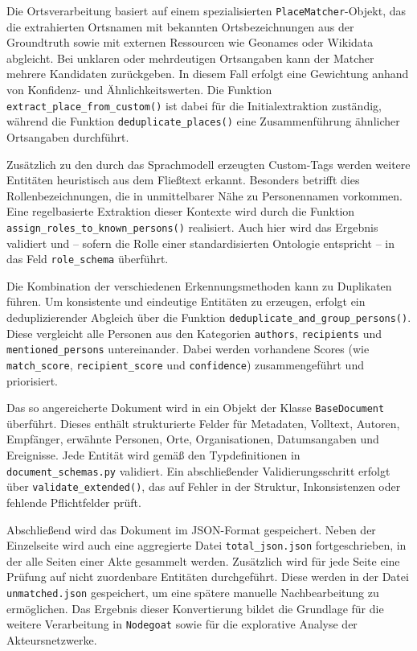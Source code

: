\documentclass[12pt, a4paper, ngerman, bidi=default]{article}
\newcommand{\code}[1]{\colorbox{VeryLightGray}{\texttt{#1}}} %
\begin{document}
Die Ortsverarbeitung basiert auf einem spezialisierten \code{PlaceMatcher}-Objekt, das die extrahierten Ortsnamen mit bekannten 
Ortsbezeichnungen aus der Groundtruth sowie mit externen Ressourcen wie Geonames oder Wikidata abgleicht. Bei unklaren oder 
mehrdeutigen Ortsangaben kann der Matcher mehrere Kandidaten zurückgeben. In diesem Fall erfolgt eine Gewichtung anhand von 
Konfidenz- und Ähnlichkeitswerten. Die Funktion \code{extract\_place\_from\_custom()} ist dabei für die Initialextraktion 
zuständig, während die Funktion \code{deduplicate\_places()} eine Zusammenführung ähnlicher Ortsangaben durchführt.

Zusätzlich zu den durch das Sprachmodell erzeugten Custom-Tags werden weitere Entitäten heuristisch aus dem Fließtext erkannt. 
Besonders betrifft dies Rollenbezeichnungen, die in unmittelbarer Nähe zu Personennamen vorkommen. Eine regelbasierte Extraktion 
dieser Kontexte wird durch die Funktion \code{assign\_roles\_to\_known\_persons()} realisiert. Auch hier wird das Ergebnis validiert 
und – sofern die Rolle einer standardisierten Ontologie entspricht – in das Feld \code{role\_schema} überführt.

Die Kombination der verschiedenen Erkennungsmethoden kann zu Duplikaten führen. Um konsistente und eindeutige Entitäten zu erzeugen, 
erfolgt ein deduplizierender Abgleich über die Funktion \code{deduplicate\_and\_group\_persons()}. Diese vergleicht alle Personen 
aus den Kategorien \code{authors}, \code{recipients} und \code{mentioned\_persons} untereinander. Dabei werden vorhandene Scores 
(wie \code{match\_score}, \code{recipient\_score} und \code{confidence}) zusammengeführt und priorisiert.

Das so angereicherte Dokument wird in ein Objekt der Klasse \code{BaseDocument} überführt. Dieses enthält strukturierte Felder für 
Metadaten, Volltext, Autoren, Empfänger, erwähnte Personen, Orte, Organisationen, Datumsangaben und Ereignisse. Jede Entität wird gemäß 
den Typdefinitionen in \code{document\_schemas.py} validiert. Ein abschließender Validierungsschritt erfolgt über 
\code{validate\_extended()}, das auf Fehler in der Struktur, Inkonsistenzen oder fehlende Pflichtfelder prüft.

Abschließend wird das Dokument im JSON-Format gespeichert. Neben der Einzelseite wird auch eine aggregierte Datei 
\code{total\_json.json} fortgeschrieben, in der alle Seiten einer Akte gesammelt werden. Zusätzlich wird für jede Seite 
eine Prüfung auf nicht zuordenbare Entitäten durchgeführt. Diese werden in der Datei \code{unmatched.json} gespeichert, 
um eine spätere manuelle Nachbearbeitung zu ermöglichen. Das Ergebnis dieser Konvertierung bildet die Grundlage für die weitere 
Verarbeitung in \code{Nodegoat} sowie für die explorative Analyse der Akteursnetzwerke.
\end{document}
